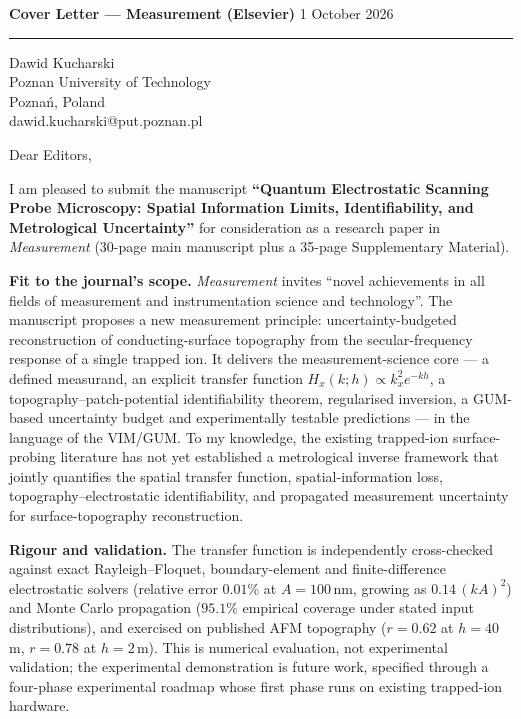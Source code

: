 \documentclass[11pt,a4paper]{article}
\begin{document}
{\large\bfseries Cover Letter --- Measurement (Elsevier)}\hfill
{\small 1 October 2026}\\[2pt]
\hrule
\vspace{8pt}

Dawid Kucharski\\
Poznan University of Technology\\
Pozna\'n, Poland\\
dawid.kucharski@put.poznan.pl

\vspace{8pt}

Dear Editors,

I am pleased to submit the manuscript \textbf{``Quantum Electrostatic
Scanning Probe Microscopy: Spatial Information Limits, Identifiability,
and Metrological Uncertainty''} for consideration as a research paper in \emph{Measurement}
(30-page main manuscript plus a 35-page Supplementary Material).

\textbf{Fit to the journal's scope.}  \emph{Measurement} invites
``novel achievements in all fields of measurement and instrumentation
science and technology''.  The manuscript proposes a new measurement
principle: uncertainty-budgeted reconstruction of conducting-surface
topography from the secular-frequency response of a single trapped ion.
It delivers the measurement-science core --- a defined measurand, an
explicit transfer function $H_x(k;h)\propto k_x^2e^{-kh}$, a
topography--patch-potential identifiability theorem, regularised
inversion, a GUM-based uncertainty budget and experimentally testable
predictions
--- in the language of the VIM/GUM.  To my knowledge, the existing
trapped-ion surface-probing literature has not yet established a
metrological inverse framework that jointly quantifies the spatial
transfer function, spatial-information loss, topography--electrostatic
identifiability, and propagated measurement uncertainty for
surface-topography reconstruction.

\textbf{Rigour and validation.}  The transfer function is independently
cross-checked against exact Rayleigh--Floquet, boundary-element and
finite-difference electrostatic solvers (relative error $0.01\%$ at
$A=100$\,nm, growing as $0.14\,(kA)^2$) and Monte Carlo propagation
($95.1\%$ empirical coverage under stated input distributions), and
exercised on published AFM topography ($r=0.62$ at $h=40$\,\textmu m,
$r=0.78$ at $h=2$\,\textmu m).  This is numerical evaluation, not
experimental validation; the experimental demonstration is future work,
specified through a four-phase experimental roadmap whose first phase runs on
existing trapped-ion hardware.
\end{document}
